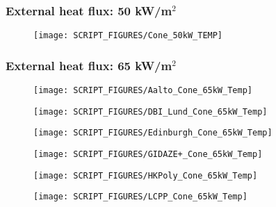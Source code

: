 \begin{landscape}
\newpage
\subsubsection{External heat flux: 50 kW/m$^2$}
\begin{minipage}{0.65\textwidth}
\begin{figure}[H]
{\texttt{[image: SCRIPT\_FIGURES/Cone\_50kW\_TEMP]}}\\
\end{figure}
\end{minipage}
\vfill

\newpage
\subsubsection{External heat flux: 65 kW/m$^2$}
\begin{minipage}{0.65\textwidth}
\begin{figure}[H]
{\texttt{[image: SCRIPT\_FIGURES/Aalto\_Cone\_65kW\_Temp]}}\\
\end{figure}
\end{minipage}
\begin{minipage}{0.35\textwidth}
\begin{figure}[H]
{\texttt{[image: SCRIPT\_FIGURES/DBI\_Lund\_Cone\_65kW\_Temp]}}\\
\end{figure}
\end{minipage}

\begin{minipage}{0.65\textwidth}
\begin{figure}[H]
{\texttt{[image: SCRIPT\_FIGURES/Edinburgh\_Cone\_65kW\_Temp]}}\\
\end{figure}
\end{minipage}
\begin{minipage}{0.35\textwidth}
\begin{figure}[H]
{\texttt{[image: SCRIPT\_FIGURES/GIDAZE+\_Cone\_65kW\_Temp]}}\\
\end{figure}
\end{minipage}

\vfill

\begin{minipage}{0.65\textwidth}
\begin{figure}[H]
{\texttt{[image: SCRIPT\_FIGURES/HKPoly\_Cone\_65kW\_Temp]}}\\
\end{figure}
\end{minipage}
\begin{minipage}{0.35\textwidth}
\begin{figure}[H]
{\texttt{[image: SCRIPT\_FIGURES/LCPP\_Cone\_65kW\_Temp]}}\\
\end{figure}
\end{minipage}


\end{landscape}
